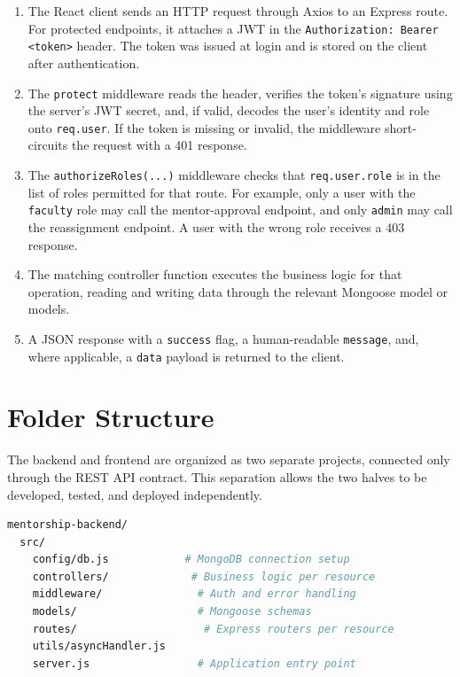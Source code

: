 \documentclass[12pt,a4paper]{report}
\newcommand{\sectionrule}{\vspace{-4pt}{\color{lightgray}\hrule height 1pt}\vspace{8pt}}
\begin{document}
\begin{enumerate}[itemsep=2pt]
  \item The React client sends an HTTP request through Axios to an Express route. For protected endpoints, it attaches a JWT in the \texttt{Authorization: Bearer <token>} header. The token was issued at login and is stored on the client after authentication.
  \item The \texttt{protect} middleware reads the header, verifies the token's signature using the server's JWT secret, and, if valid, decodes the user's identity and role onto \texttt{req.user}. If the token is missing or invalid, the middleware short-circuits the request with a 401 response.
  \item The \texttt{authorizeRoles(...)} middleware checks that \texttt{req.user.role} is in the list of roles permitted for that route. For example, only a user with the \texttt{faculty} role may call the mentor-approval endpoint, and only \texttt{admin} may call the reassignment endpoint. A user with the wrong role receives a 403 response.
  \item The matching controller function executes the business logic for that operation, reading and writing data through the relevant Mongoose model or models.
  \item A JSON response with a \texttt{success} flag, a human-readable \texttt{message}, and, where applicable, a \texttt{data} payload is returned to the client.
\end{enumerate}

\section{Folder Structure}
\sectionrule
The backend and frontend are organized as two separate projects, connected only through the REST API contract. This separation allows the two halves to be developed, tested, and deployed independently.

\begin{lstlisting}[language=bash, caption={Backend folder structure}]
mentorship-backend/
  src/
    config/db.js            # MongoDB connection setup
    controllers/             # Business logic per resource
    middleware/               # Auth and error handling
    models/                   # Mongoose schemas
    routes/                    # Express routers per resource
    utils/asyncHandler.js
    server.js                 # Application entry point
\end{lstlisting}
\end{document}
